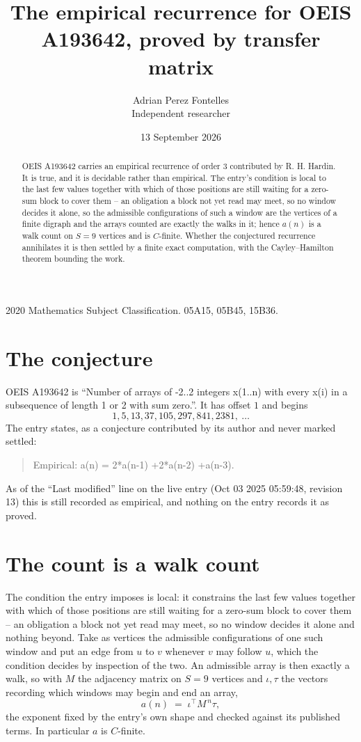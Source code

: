 \documentclass[11pt,a4paper]{article}
\title{The empirical recurrence for OEIS A193642, proved by transfer matrix}
\author{Adrian Perez Fontelles\\ \small Independent researcher}
\date{13 September 2026}
\theoremstyle{plain}
\theoremstyle{definition}
\begin{document}
\maketitle

\begin{abstract}
OEIS A193642 carries an empirical recurrence of order $3$ contributed by R. H. Hardin. It is
true, and it is decidable rather than empirical. The entry's condition is local to the last few values together with which of those positions are still waiting for a zero-sum block to cover them -- an obligation a block not yet read may meet, so no window decides it alone, so
the admissible configurations of such a window are the vertices of a finite digraph and the
arrays counted are exactly the walks in it; hence $a(n)$ is a walk count on $S=9$ vertices
and is $C$-finite. Whether the conjectured recurrence annihilates it is then settled by a
finite exact computation, with the Cayley--Hamilton theorem bounding the work.
\end{abstract}

\noindent\small 2020 Mathematics Subject Classification. 05A15, 05B45, 15B36.\normalsize

\section{The conjecture}

OEIS A193642 is ``Number of arrays of -2..2 integers x(1..n) with every x(i) in a subsequence of length 1 or 2 with sum zero.''. It has offset $1$ and begins
\[
1, 5, 13, 37, 105, 297, 841, 2381,\ \dots
\]
The entry states, as a conjecture contributed by its author and never marked settled:
\begin{quote}
Empirical: a(n) = 2*a(n-1) +2*a(n-2) +a(n-3).
\end{quote}
As of the ``Last modified'' line on the live entry (Oct 03 2025 05:59:48, revision 13) this is still
recorded as empirical, and nothing on the entry records it as proved.

\section{The count is a walk count}

The condition the entry imposes is local: it constrains the last few values together with which of those positions are still waiting for a zero-sum block to cover them -- an obligation a block not yet read may meet, so no window decides it alone and nothing beyond. Take as
vertices the admissible configurations of one such window and put an edge from $u$ to $v$
whenever $v$ may follow $u$, which the condition decides by inspection of the two. An
admissible array is then exactly a walk, so with $M$ the adjacency matrix on $S=9$ vertices
and $\iota,\tau$ the vectors recording which windows may begin and end an array,
\[
a(n)\;=\;\iota^{\!\top}M^{\,n}\tau ,
\]
the exponent fixed by the entry's own shape and checked against its published terms. In
particular $a$ is $C$-finite.
\end{document}
